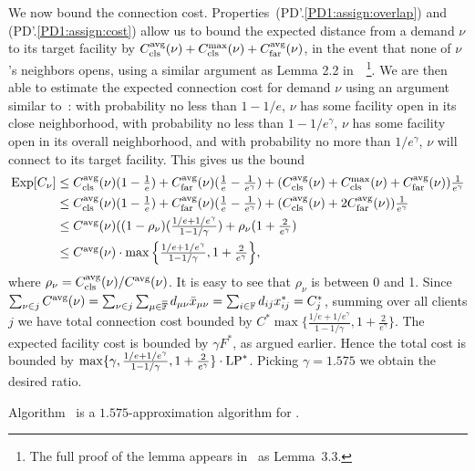 We now bound the connection
cost. Properties~(PD'.\ref{PD1:assign:overlap}) and
(PD'.\ref{PD1:assign:cost}) allow us to bound the expected
distance from a demand $\nu$ to its target facility by
$C_{\text{cls}}^{{\mbox{\scriptsize\rm avg}}}(\nu)+C_{\text{cls}}^{\max}(\nu)+C_{\text{far}}^{{\mbox{\scriptsize\rm avg}}}(\nu)$, in the event
that none of $\nu$'s neighbors opens, using a similar
argument as Lemma 2.2 in~\cite{ByrkaGS10}~\footnote{The full
  proof of the lemma appears in~\cite{ByrkaA10} as
  Lemma~3.3.}. We are then able to estimate the expected
connection cost for demand $\nu$ using an argument similar
to~\cite{ByrkaGS10}: with probability
no less than $1-1/e$, $\nu$ has some facility open in its
close neighborhood, with probability no less than
$1-1/e^\gamma$, $\nu$ has some facility open in its overall
neighborhood, and with probability no more than
$1/e^\gamma$, $\nu$ will connect to its target facility.
This gives us the bound
%
\begin{align}
  \mbox{\rm Exp}[C_{\nu}] &\leq 
	\textstyle 
	C_{\text{cls}}^{{\mbox{\scriptsize\rm avg}}}(\nu)(1-\frac{1}{e}) + C_{\text{far}}^{{\mbox{\scriptsize\rm avg}}}(\nu)(\frac{1}{e}-\frac{1}{e^\gamma}) 
					+ (C_{\text{cls}}^{{\mbox{\scriptsize\rm avg}}}(\nu)+C_{\text{cls}}^{\max}(\nu)+C_{\text{far}}^{{\mbox{\scriptsize\rm avg}}}(\nu))\frac{1}{e^\gamma}
\\
  &\leq 
	\textstyle
	C_{\text{cls}}^{{\mbox{\scriptsize\rm avg}}}(\nu)(1-\frac{1}{e}) + C_{\text{far}}^{{\mbox{\scriptsize\rm avg}}}(\nu)(\frac{1}{e}-\frac{1}{e^\gamma})
	 			+ (C_{\text{cls}}^{{\mbox{\scriptsize\rm avg}}}(\nu)+2C_{\text{far}}^{{\mbox{\scriptsize\rm avg}}}(\nu))\frac{1}{e^\gamma}
\\
  &\leq
	\textstyle
  C^{{\mbox{\scriptsize\rm avg}}}(\nu)((1-\rho_{\nu})(\frac{1/e+1/e^\gamma}{1-1/\gamma})
  + \rho_{\nu}(1+\frac{2}{e^\gamma}) 
\\
  &\leq 
	\textstyle
	C^{{\mbox{\scriptsize\rm avg}}}(\nu) \cdot \max\Big\{\frac{1/e+1/e^\gamma}{1-1/\gamma},
  								1+\frac{2}{e^\gamma}\Big\},
\end{align}
%
where $\rho_{\nu}=C_{\text{cls}}^{{\mbox{\scriptsize\rm avg}}}(\nu)/C^{{\mbox{\scriptsize\rm avg}}}(\nu)$. It is easy
to see that $\rho_{\nu}$ is between 0 and 1.
Since $\sum_{\nu\in j} C^{{\mbox{\scriptsize\rm avg}}}(\nu) = \sum_{\nu\in
  j}\sum_{\mu\in\overline{\mathbb{F}}} d_{\mu\nu}{\bar x}_{\mu\nu} =
\sum_{i\in\mathbb{F}} d_{ij}x_{ij}^\ast = C_j^\ast$, summing
over all clients $j$ we have total connection cost bounded
by $C^\ast \max\{\frac{1/e+1/e^\gamma}{1-1/\gamma},
1+\frac{2}{e^\gamma}\}$. The expected facility cost is
bounded by $\gamma F^\ast$, as argued earlier. Hence the
total cost is bounded by $\max\{\gamma,
\frac{1/e+1/e^\gamma}{1-1/\gamma},
1+\frac{2}{e^\gamma}\}\cdot \mbox{\rm LP}^\ast$. Picking
$\gamma=1.575$ we obtain the desired ratio.


\begin{theorem}\label{thm:ebgs}
  Algorithm~{\EBGS} is a $1.575$-approximation algorithm for \FTFP.
\end{theorem}



